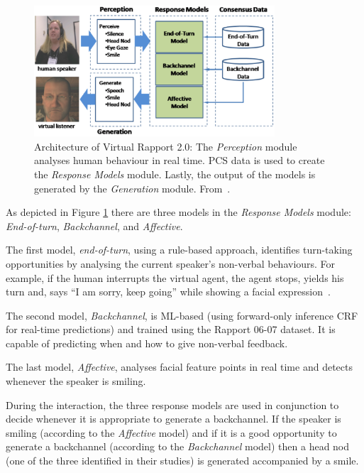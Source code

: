 \begin{figure}[hbt]
  \centering
  \includegraphics[width=0.8\textwidth]{images/VirtualRapport2_System.png}
  \caption{Architecture of Virtual Rapport 2.0: The \textit{Perception} module analyses human behaviour in real time. \ac{PCS} data is used to create the \textit{Response Models} module. Lastly, the output of the models is generated by the \textit{Generation} module. From~\cite{Buschmeier2011}.}
  \label{fig:virtualrapport2System}
\end{figure} 

As depicted in Figure \ref{fig:virtualrapport2System} there are three models in the \textit{Response Models} module: \textit{End-of-turn}, \textit{Backchannel}, and \textit{Affective}.

The first model, \textit{end-of-turn}, using a rule-based approach, identifies turn-taking opportunities by analysing the current speaker's non-verbal behaviours. For example, if the human interrupts the virtual agent, the agent stops, yields his turn and, says ``I am sorry, keep going'' while showing a facial expression~\cite{Buschmeier2011}.

The second model, \textit{Backchannel}, is \ac{ML}-based (using forward-only inference \ac{CRF} for real-time predictions) and trained using the Rapport 06-07 dataset. It is capable of predicting when and how to give non-verbal feedback.

The last model, \textit{Affective}, analyses facial feature points in real time and detects whenever the speaker is smiling.
 
During the interaction, the three response models are used in conjunction to decide whenever it is appropriate to generate a backchannel. If the speaker is smiling (according to the \textit{Affective} model) and if it is a good opportunity to generate a backchannel (according to the \textit{Backchannel} model) then a head nod (one of the three identified in their studies) is generated accompanied by a smile.

